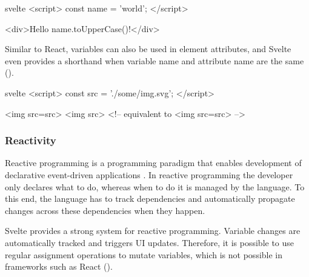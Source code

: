 
\begin{listing}[h!]
\begin{myminted}{svelte}{}
<script>
  const name = 'world';
</script>

<div>Hello {name.toUpperCase()}!</div>
\end{myminted}
\caption{Example for JavaScript-expressions in Svelte.}
\label{fig:svelte-javascript-expression}
\end{listing}

Similar to React, variables can also be used in element attributes, and Svelte even provides a shorthand when variable name and attribute name are the same ().

\begin{listing}[h!]
\begin{myminted}{svelte}{}
<script>
  const src = './some/img.svg';
</script>

<img src={src}>
<img {src}> <!-- equivalent to <img src={src}> -->
\end{myminted}
\caption{Syntax for using variables in element-attributes.}
\label{fig:svelte-attribute-variables}
\end{listing}

\subsubsection{Reactivity}
\label{sec:svelte-reactivity}

Reactive programming is a programming paradigm that enables development of declarative event-driven applications \cite{bainomugisha_survey_2013}. In reactive programming the developer only declares what to do, whereas when to do it is managed by the language. To this end, the language has to track dependencies and automatically propagate changes across these dependencies when they happen.

Svelte provides a strong system for reactive programming. Variable changes are automatically tracked and triggers UI updates. Therefore, it is possible to use regular assignment operations to mutate variables, which is not possible in frameworks such as React ().

